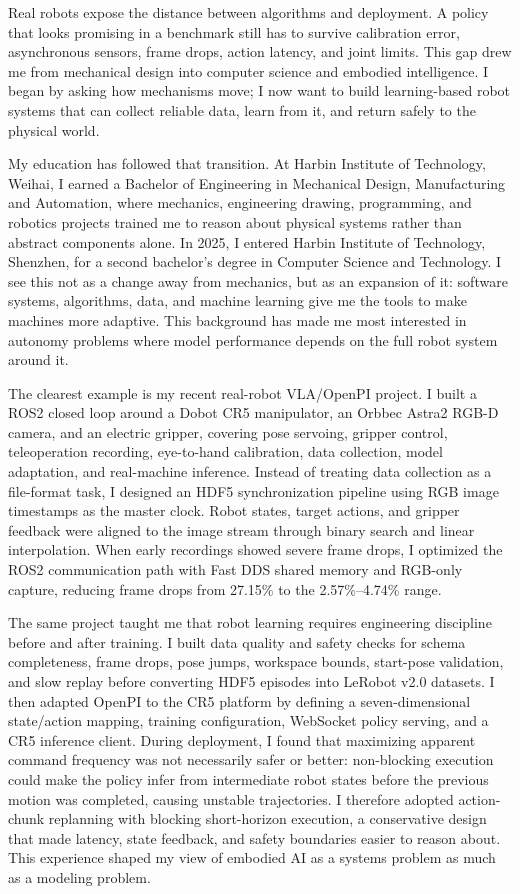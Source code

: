 Real robots expose the distance between algorithms and deployment. A policy that looks promising in a benchmark still has to survive calibration error, asynchronous sensors, frame drops, action latency, and joint limits. This gap drew me from mechanical design into computer science and embodied intelligence. I began by asking how mechanisms move; I now want to build learning-based robot systems that can collect reliable data, learn from it, and return safely to the physical world.

My education has followed that transition. At Harbin Institute of Technology, Weihai, I earned a Bachelor of Engineering in Mechanical Design, Manufacturing and Automation, where mechanics, engineering drawing, programming, and robotics projects trained me to reason about physical systems rather than abstract components alone. In 2025, I entered Harbin Institute of Technology, Shenzhen, for a second bachelor's degree in Computer Science and Technology. I see this not as a change away from mechanics, but as an expansion of it: software systems, algorithms, data, and machine learning give me the tools to make machines more adaptive. This background has made me most interested in autonomy problems where model performance depends on the full robot system around it.

The clearest example is my recent real-robot VLA/OpenPI project. I built a ROS2 closed loop around a Dobot CR5 manipulator, an Orbbec Astra2 RGB-D camera, and an electric gripper, covering pose servoing, gripper control, teleoperation recording, eye-to-hand calibration, data collection, model adaptation, and real-machine inference. Instead of treating data collection as a file-format task, I designed an HDF5 synchronization pipeline using RGB image timestamps as the master clock. Robot states, target actions, and gripper feedback were aligned to the image stream through binary search and linear interpolation. When early recordings showed severe frame drops, I optimized the ROS2 communication path with Fast DDS shared memory and RGB-only capture, reducing frame drops from 27.15\% to the 2.57\%--4.74\% range.

The same project taught me that robot learning requires engineering discipline before and after training. I built data quality and safety checks for schema completeness, frame drops, pose jumps, workspace bounds, start-pose validation, and slow replay before converting HDF5 episodes into LeRobot v2.0 datasets. I then adapted OpenPI to the CR5 platform by defining a seven-dimensional state/action mapping, training configuration, WebSocket policy serving, and a CR5 inference client. During deployment, I found that maximizing apparent command frequency was not necessarily safer or better: non-blocking execution could make the policy infer from intermediate robot states before the previous motion was completed, causing unstable trajectories. I therefore adopted action-chunk replanning with blocking short-horizon execution, a conservative design that made latency, state feedback, and safety boundaries easier to reason about. This experience shaped my view of embodied AI as a systems problem as much as a modeling problem.

